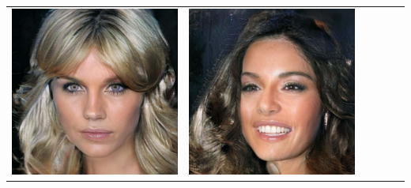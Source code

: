 \documentclass[a0,landscape]{a0poster}
\begin{document}
\begin{multicols}{3}
\begin{center}
\begin{tabular}{cc|cc|cc}
\includegraphics[width=\pganw]{../figures/pgan/62_base_iso_reject.jpg} &
\includegraphics[width=\pganw]{../figures/pgan/63_base_iso_reject.jpg} &

\end{tabular}
\end{center}
\end{multicols}
\end{document}
